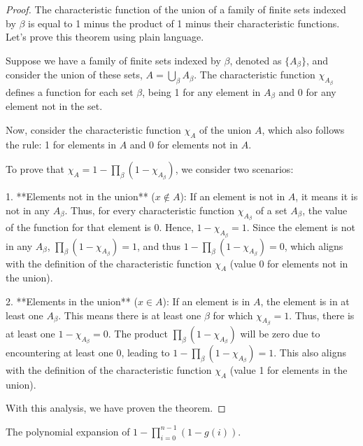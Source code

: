 \begin{proof}
  \leanok
The characteristic function of the union of a family of finite sets indexed by \(\beta\) is equal to 1 minus the product of 1 minus their characteristic functions. Let's prove this theorem using plain language.

Suppose we have a family of finite sets indexed by \(\beta\), denoted as \(\{A_\beta\}\), and consider the union of these sets, \(A = \bigcup_\beta A_\beta\). The characteristic function \(\chi_{A_\beta}\) defines a function for each set \(\beta\), being 1 for any element in \(A_\beta\) and 0 for any element not in the set.

Now, consider the characteristic function \(\chi_A\) of the union \(A\), which also follows the rule: 1 for elements in \(A\) and 0 for elements not in \(A\).

To prove that \(\chi_A = 1 - \prod_\beta (1 - \chi_{A_\beta})\), we consider two scenarios:

1. **Elements not in the union** (\(x \not\in A\)): If an element is not in \(A\), it means it is not in any \(A_\beta\). Thus, for every characteristic function \(\chi_{A_\beta}\) of a set \(A_\beta\), the value of the function for that element is 0. Hence, \(1 - \chi_{A_\beta} = 1\). Since the element is not in any \(A_\beta\), \(\prod_\beta (1 - \chi_{A_\beta}) = 1\), and thus \(1 - \prod_\beta (1 - \chi_{A_\beta}) = 0\), which aligns with the definition of the characteristic function \(\chi_A\) (value 0 for elements not in the union).

2. **Elements in the union** (\(x \in A\)): If an element is in \(A\), the element is in at least one \(A_\beta\). This means there is at least one \(\beta\) for which \(\chi_{A_\beta} = 1\). Thus, there is at least one \(1 - \chi_{A_\beta} = 0\). The product \(\prod_\beta (1 - \chi_{A_\beta})\) will be zero due to encountering at least one 0, leading to \(1 - \prod_\beta (1 - \chi_{A_\beta}) = 1\). This also aligns with the definition of the characteristic function \(\chi_A\) (value 1 for elements in the union).

With this analysis, we have proven the theorem.
\end{proof}

\begin{lemma}\label{mul_expand₀}
  \leanok
  The polynomial expansion of \(1 - \prod_{i=0}^{n-1} (1 - g(i))\).
\end{lemma}

